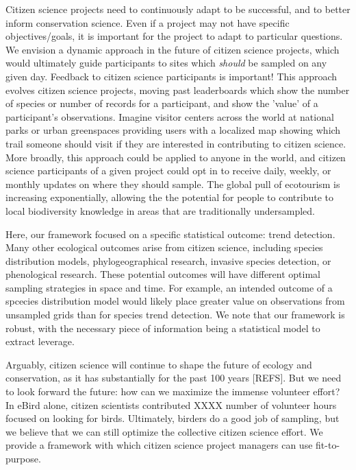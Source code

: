 \documentclass[9pt,twocolumn,twoside,lineno]{pnas-new}
\begin{document}
Citizen science projects need to continuously adapt to be successful, and to better inform conservation science. Even if a project may not have specific objectives/goals, it is important for the project to adapt to particular questions. We envision a dynamic approach in the future of citizen science projects, which would ultimately guide participants to sites which \textit{should} be sampled on any given day. Feedback to citizen science participants is important! This approach evolves citizen science projects, moving past leaderboards which show the number of species or number of records for a participant, and show the 'value' of a participant's observations. Imagine visitor centers across the world at national parks or urban greenspaces providing users with a localized map showing which trail someone should visit if they are interested in contributing to citizen science. More broadly, this approach could be applied to anyone in the world, and citizen science participants of a given project could opt in to receive daily, weekly, or monthly updates on where they should sample. The global pull of ecotourism is increasing exponentially, allowing the the potential for people to contribute to local biodiversity knowledge in areas that are traditionally undersampled.

Here, our framework focused on a specific statistical outcome: trend detection. Many other ecological outcomes arise from citizen science, including species distribution models, phylogeographical research, invasive species detection, or phenological research. These potential outcomes will have different optimal sampling strategies in space and time. For example, an intended outcome of a spcecies distribution model would likely place greater value on observations from unsampled grids than for species trend detection. We note that our framework is robust, with the necessary piece of information being a statistical model to extract leverage.

Arguably, citizen science will continue to shape the future of ecology and conservation, as it has substantially for the past 100 years [REFS]. But we need to look forward the future: how can we maximize the immense volunteer effort? In eBird alone, citizen scientists contributed XXXX number of volunteer hours focused on looking for birds. Ultimately, birders do a good job of sampling, but we believe that we can still optimize the collective citizen science effort. We provide a framework with which citizen science project managers can use fit-to-purpose.
\end{document}
